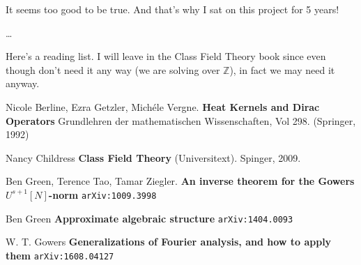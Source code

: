 \documentclass[12pt]{article}
\begin{document}
It seems too good to be true.  And that's why I sat on this project for 5 years!
\newpage

\noindent \dots 

\vfill


\noindent Here's a reading list. I will leave in the Class Field Theory book since even though don't need it any way (we are solving over $\mathbb{Z}$), in fact we may need it anyway.

\begin{thebibliography}{}

\item Nicole Berline, Ezra Getzler, Mich\'{e}le Vergne. \textbf{Heat Kernels and Dirac Operators} Grundlehren der mathematischen Wissenschaften, Vol 298. (Springer, 1992)

\item Nancy Childress \textbf{Class Field Theory} (Universitext).  Spinger, 2009.

\item Ben Green, Terence Tao, Tamar Ziegler. \textbf{An inverse theorem for the Gowers $U^{s+1}[N]$-norm} \texttt{arXiv:1009.3998}

\item Ben Green \textbf{Approximate algebraic structure} \texttt{arXiv:1404.0093}

\item W. T. Gowers \textbf{Generalizations of Fourier analysis, and how to apply them} \texttt{arXiv:1608.04127}

\end{thebibliography}

\end{document}

